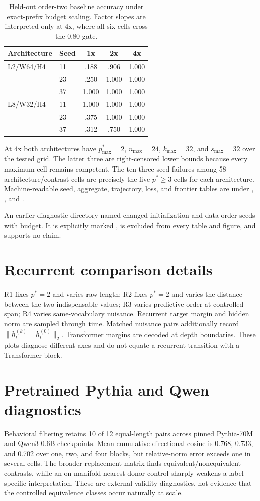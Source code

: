 \begin{table}[H]\centering\small
\begin{tabular}{llccc}\toprule
Architecture & Seed & 1x & 2x & 4x\\\midrule
L2/W64/H4 & 11 & .188 & .906 & 1.000\\
 & 23 & .250 & 1.000 & 1.000\\
 & 37 & 1.000 & 1.000 & 1.000\\
L8/W32/H4 & 11 & 1.000 & 1.000 & 1.000\\
 & 23 & .375 & 1.000 & 1.000\\
 & 37 & .312 & .750 & 1.000\\\bottomrule
\end{tabular}
\caption{Held-out order-two baseline accuracy under exact-prefix budget scaling. Factor slopes are interpreted only at 4x, where all six cells cross the 0.80 gate.}
\end{table}

At 4x both architectures have $p^*_{\max}=2$, $n_{\max}=24$, $k_{\max}=32$, and $s_{\max}=32$ over the tested grid. The latter three are right-censored lower bounds because every maximum cell remains competent. The ten three-seed failures among 58 architecture/contrast cells are precisely the five $p^*\ge3$ cells for each architecture. Machine-readable seed, aggregate, trajectory, loss, and frontier tables are under , , and .

An earlier diagnostic directory named  changed initialization and data-order seeds with budget. It is explicitly marked , is excluded from every table and figure, and supports no claim.

\section{Recurrent comparison details}
R1 fixes $p^*=2$ and varies raw length; R2 fixes $p^*=2$ and varies the distance between the two indispensable values; R3 varies predictive order at controlled span; R4 varies same-vocabulary nuisance. Recurrent target margin and hidden norm are sampled through time. Matched nuisance pairs additionally record $\|h_t^{(k)}-h_t^{(0)}\|_2$. Transformer margins are decoded at depth boundaries. These plots diagnose different axes and do not equate a recurrent transition with a Transformer block.

\section{Pretrained Pythia and Qwen diagnostics}
Behavioral filtering retains 10 of 12 equal-length pairs across pinned Pythia-70M and Qwen3-0.6B checkpoints. Mean cumulative directional cosine is 0.768, 0.733, and 0.702 over one, two, and four blocks, but relative-norm error exceeds one in several cells. The broader replacement matrix finds equivalent/nonequivalent contrasts, while an on-manifold nearest-donor control sharply weakens a label-specific interpretation. These are external-validity diagnostics, not evidence that the controlled equivalence classes occur naturally at scale.


